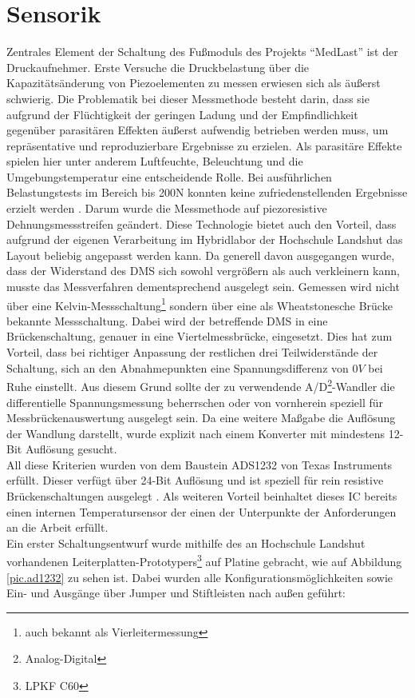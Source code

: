\documentclass[12pt]{scrreprt} %
\begin{document}
\section{Sensorik}
\label{Sensorik}
Zentrales Element der Schaltung des Fußmoduls des Projekts "`MedLast"' ist der Druckaufnehmer. Erste Versuche die Druckbelastung über die Kapazitätsänderung von Piezoelementen zu messen erwiesen sich als äußerst schwierig. Die Problematik bei dieser Messmethode besteht darin, dass sie aufgrund der Flüchtigkeit der geringen Ladung und der Empfindlichkeit gegenüber parasitären Effekten äußerst aufwendig betrieben werden muss, um repräsentative und reproduzierbare Ergebnisse zu erzielen. Als parasitäre Effekte spielen hier unter anderem Luftfeuchte, Beleuchtung und die Umgebungstemperatur eine entscheidende Rolle. Bei ausführlichen Belastungstests im Bereich bis 200N konnten keine zufriedenstellenden Ergebnisse erzielt werden \citep{Jobstmann2012}. Darum wurde die Messmethode auf piezoresistive Dehnungsmessstreifen geändert. Diese Technologie bietet auch den Vorteil, dass aufgrund der eigenen Verarbeitung im Hybridlabor der Hochschule Landshut das Layout beliebig angepasst werden kann. Da generell davon ausgegangen wurde, dass der Widerstand des DMS sich sowohl vergrößern als auch verkleinern kann, musste das Messverfahren dementsprechend ausgelegt sein. Gemessen wird nicht über eine Kelvin-Messschaltung\footnote{auch bekannt als Vierleitermessung} sondern über eine als Wheatstonesche Brücke bekannte Messschaltung. Dabei wird der betreffende DMS in eine Brückenschaltung, genauer in eine Viertelmessbrücke, eingesetzt. Dies hat zum Vorteil, dass bei richtiger Anpassung der restlichen drei Teilwiderstände der Schaltung, sich an den Abnahmepunkten eine Spannungsdifferenz von $0V$ bei Ruhe einstellt. Aus diesem Grund sollte der zu verwendende A/D\footnote{Analog-Digital}-Wandler die differentielle Spannungsmessung beherrschen oder von vornherein speziell für Messbrückenauswertung ausgelegt sein. Da eine weitere Maßgabe die Auflösung der Wandlung darstellt, wurde explizit nach einem Konverter mit mindestens 12-Bit Auflösung gesucht.\\
All diese Kriterien wurden von dem Baustein ADS1232 von Texas Instruments erfüllt. Dieser verfügt über 24-Bit Auflösung und ist speziell für rein resistive Brückenschaltungen ausgelegt \citep{ADS1232}. Als weiteren Vorteil beinhaltet dieses IC bereits einen internen Temperatursensor der einen der Unterpunkte der Anforderungen an die Arbeit erfüllt.\\
Ein erster Schaltungsentwurf wurde mithilfe des an Hochschule Landshut vorhandenen Leiterplatten-Prototypers\footnote{LPKF C60} auf Platine gebracht, wie auf Abbildung \vref{pic.ad1232} zu sehen ist. Dabei wurden alle Konfigurationsmöglichkeiten sowie Ein- und Ausgänge über Jumper und Stiftleisten nach außen geführt:
\end{document}
